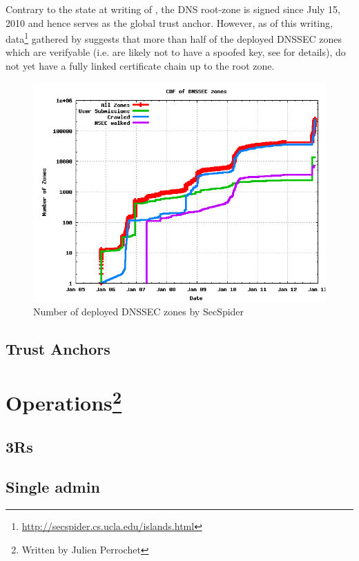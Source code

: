 \documentclass[a4paper]{scrartcl}
\newcommand{\wbjp}{\protect\footnote{Written by Julien Perrochet}}
\begin{document}
Contrary to the state at writing of \cite{Osterweil09}, the DNS
root-zone is signed since July 15, 2010 \cite{root-dnssec} and hence
serves as the global trust anchor. However, as of this writing,
data\footnote{\url{http://secspider.cs.ucla.edu/islands.html}}
gathered by \cite{secspider} suggests that more than half of the
deployed DNSSEC zones which are verifyable (i.e. are likely not to
have a spoofed key, see \cite{Osterweil09} for details), do not yet
have a fully linked certificate chain up to the root zone.

\begin{figure}
  \includegraphics[width=\linewidth]{dnssec-growth}
  \caption{Number of deployed DNSSEC zones by
    SecSpider \cite{secspider}}
  \label{fig:dnssec-growth}
\end{figure}

\subsection{Trust Anchors}




\section{Operations\wbjp}
\subsection{3Rs}
\subsection{Single admin}
\end{document}
